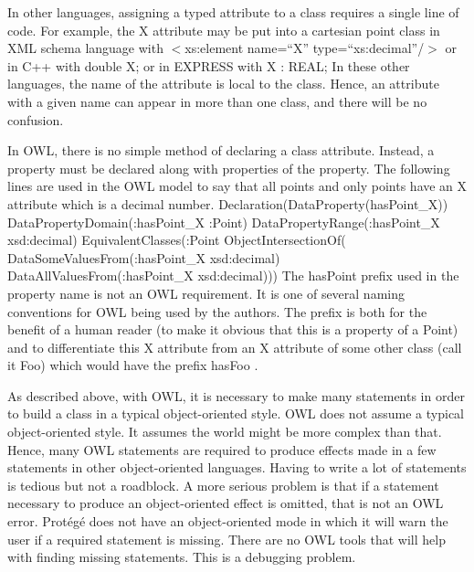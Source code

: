 In other languages, assigning a typed attribute to a class requires a
single line of code. For example, the X attribute may be put into a
cartesian point class in XML schema language with
\newline \sf $<$xs:element name=``X'' type=``xs:decimal''/$>$\rm
\newline or in C++ with
\newline \sf double X; \rm
\newline or in EXPRESS with
\newline \sf X : REAL; \rm \newline
In these other languages, the name of the attribute is local to the class.
Hence, an attribute with a given name can appear in more than one class, and
there will be no confusion.

In OWL, there is no simple method of declaring a class attribute. Instead,
a property must be declared along with properties of the property. The
following lines are used in the OWL model to say that all points and only
points have an X attribute which is a decimal number.
\newline
\newline \sf Declaration(DataProperty(hasPoint\_X))
\newline DataPropertyDomain(:hasPoint\_X :Point)
\newline DataPropertyRange(:hasPoint\_X xsd:decimal)
\newline EquivalentClasses(:Point ObjectIntersectionOf(
\newline \hspace*{0.2in}DataSomeValuesFrom(:hasPoint\_X xsd:decimal)
\newline \hspace*{0.2in}DataAllValuesFrom(:hasPoint\_X xsd:decimal))) \rm
\newline
\newline
The \sf hasPoint \rm prefix used in the property name is not an OWL
requirement. It is one of several naming conventions for OWL being used by
the authors. The prefix is both for the benefit of a human reader (to make
it obvious that this is a property of a Point) and to differentiate this X
attribute from an X attribute of some other class (call it \sf Foo\rm)
which would have the prefix \sf hasFoo \rm.

As described above, with OWL, it is necessary to make many statements in
order to build a class in a typical object-oriented style. OWL does not
assume a typical object-oriented style. It assumes the world might be more
complex than that. Hence, many OWL statements are required to produce
effects made in a few statements in other object-oriented languages. Having
to write a lot of statements is tedious but not a roadblock. A more serious
problem is that if a statement necessary to produce an object-oriented
effect is omitted, that is not an OWL error.  Prot\'{e}g\'{e} does not have an
object-oriented mode in which it will warn the user if a required statement
is missing. There are no OWL tools that will help with finding missing
statements. This is a debugging problem.

